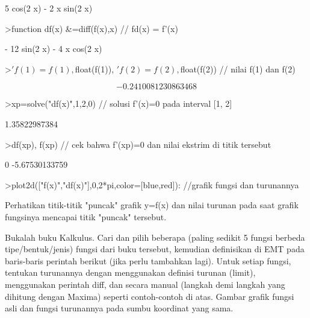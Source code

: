 \documentclass{article}
\begin{document}
\begin{eulernotebook}
\begin{eulercomment}
\begin{eulercomment}
\begin{eulercomment}
\begin{eulercomment}
\begin{euleroutput}
                        5 cos(2 x) - 2 x sin(2 x)
  
\end{euleroutput}
\begin{eulerprompt}
>function df(x) &=diff(f(x),x) // fd(x) = f'(x)
\end{eulerprompt}
\begin{euleroutput}
  
                       - 12 sin(2 x) - 4 x cos(2 x)
  
\end{euleroutput}
\begin{eulerprompt}
>$'f(1)=f(1), $float(f(1)), $'f(2)=f(2), $float(f(2)) // nilai f(1) dan f(2)
\end{eulerprompt}
\begin{eulerformula}
\[
-0.2410081230863468
\]
\end{eulerformula}
\begin{eulerprompt}
>xp=solve("df(x)",1,2,0) // solusi f'(x)=0 pada interval [1, 2]
\end{eulerprompt}
\begin{euleroutput}
  1.35822987384
\end{euleroutput}
\begin{eulerprompt}
>df(xp), f(xp) // cek bahwa f'(xp)=0 dan nilai ekstrim di titik tersebut
\end{eulerprompt}
\begin{euleroutput}
  0
  -5.67530133759
\end{euleroutput}
\begin{eulerprompt}
>plot2d(["f(x)","df(x)"],0,2*pi,color=[blue,red]): //grafik fungsi dan turunannya
\end{eulerprompt}
\begin{eulercomment}
Perhatikan titik-titik "puncak" grafik y=f(x) dan nilai turunan pada saat grafik fungsinya mencapai titik "puncak" tersebut.
\end{eulercomment}
\begin{eulercomment}
Bukalah buku Kalkulus. Cari dan pilih beberapa (paling sedikit 5
fungsi berbeda tipe/bentuk/jenis) fungsi dari buku tersebut, kemudian
definisikan di EMT pada baris-baris perintah berikut (jika perlu
tambahkan lagi). Untuk setiap fungsi, tentukan turunannya dengan
menggunakan definisi turunan (limit), menggunakan perintah diff, dan
secara manual (langkah demi langkah yang dihitung dengan Maxima)
seperti contoh-contoh di atas. Gambar grafik fungsi asli dan fungsi
turunannya pada sumbu koordinat yang sama.


\end{eulercomment}
\end{eulercomment}
\end{eulercomment}
\end{eulercomment}
\end{eulercomment}
\end{eulernotebook}
\end{document}
